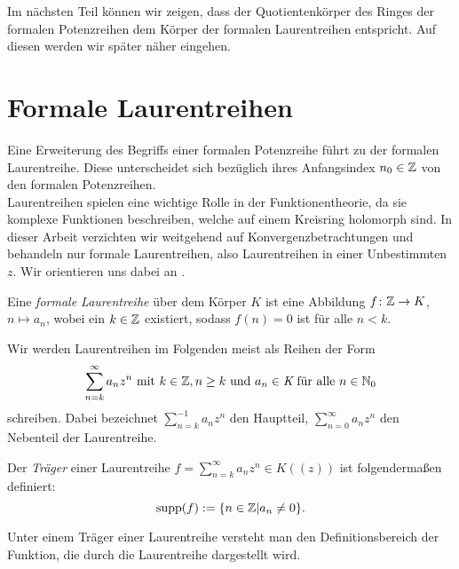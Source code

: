 %
%
%
%
%
%
%
%
%
%
%
%
%
Im nächsten Teil können wir zeigen, dass der Quotientenkörper des Ringes der formalen Potenzreihen dem Körper der formalen Laurentreihen entspricht. Auf diesen werden wir später näher eingehen. 
%
%
%
%
\section{Formale Laurentreihen}
%
Eine Erweiterung des Begriffs einer formalen Potenzreihe führt zu der formalen Laurentreihe. Diese unterscheidet sich bezüglich ihres Anfangsindex $n_0 \in \mathbb{Z}$ von den formalen Potenzreihen. \\
Laurentreihen spielen eine wichtige Rolle in der Funktionentheorie, da sie komplexe Funktionen beschreiben, welche auf einem Kreisring holomorph sind. In dieser Arbeit verzichten wir weitgehend auf Konvergenzbetrachtungen und behandeln nur formale Laurentreihen, also Laurentreihen in einer Unbestimmten $z$. %
Wir orientieren uns dabei an \cite[S. 563 - 572]{Lueneburg08}.
%
\begin{defn}
Eine \textit{formale Laurentreihe} über dem Körper $K$ ist eine Abbildung $f \colon \mathbb{Z} \rightarrow K$, $n \mapsto a_n$, wobei ein $k\in \mathbb{Z}$ existiert, sodass $f(n) = 0$ ist für alle $n < k$.
\end{defn}
%
%
\begin{nota}
Wir werden Laurentreihen im Folgenden meist als Reihen der Form
\begin{equation*}
\sum_{n= k}^{\infty}a_nz^n \text{ mit } k \in \mathbb{Z}, n \ge k \text{ und }a_n \in\textit{K}\text{ für alle } n\in\mathbb{N}_0 
\end{equation*} 
schreiben.
Dabei bezeichnet $\sum_{n=k}^{-1}a_{n}z^{n}$ den Hauptteil, $\sum_{n=0}^{\infty}a_nz^n$ den Nebenteil der Laurentreihe. 
\end{nota}
%
%
%
%
%
%
%
%
%
%
% 
\begin{defn}\label{traeger}
Der \textit{Träger} einer Laurentreihe $f = \sum_{n =k}^{\infty} a_nz^n \in K((z))$ ist folgendermaßen definiert: 
\[\text{supp}(f) := \lbrace n \in \mathbb{Z} | a_n \neq 0 \rbrace.\] 
\end{defn}
%
%
%
%
\newpage
\begin{bem}
Unter einem Träger einer Laurentreihe versteht man den Definitionsbereich der Funktion, die durch die Laurentreihe dargestellt wird.
\end{bem}
%
%
%
%
